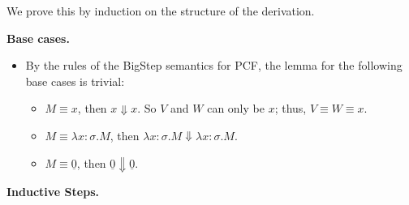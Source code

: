     We prove this by induction on the structure of the derivation.

    \textbf{Base cases.}
    \begin{itemize}
        \item By the rules of the BigStep semantics for PCF, the lemma for the following base cases is trivial:
            \begin{itemize}
                \item $M \equiv x$, then $x \Downarrow x$. So $V$ and $W$ can only be $x$; thus, $V \equiv W \equiv x$.
                \item $M \equiv \lambda x:\sigma.M$, then $\lambda x:\sigma.M \Downarrow \lambda x:\sigma.M$.
                \item $M \equiv \underline{0}$, then $\underline{0} \Downarrow \underline{0}$.
            \end{itemize}
    \end{itemize}
    \textbf{Inductive Steps.}

